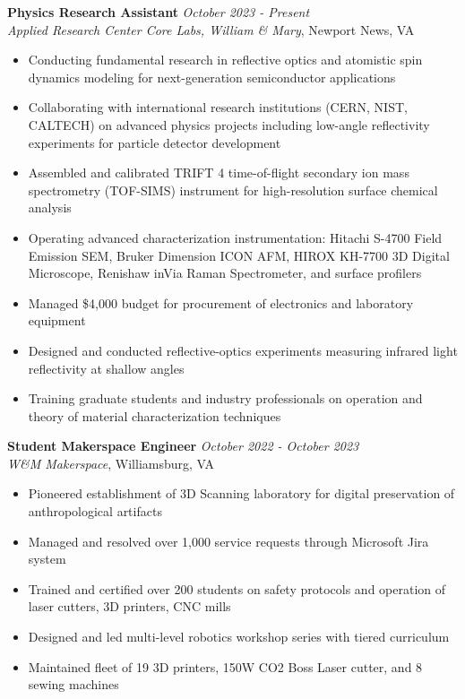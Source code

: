 \documentclass[11pt,letterpaper]{article}
\newcommand{\daterange}[1]{\textit{\color{secondary}#1}}
\newcommand{\position}[1]{\textbf{#1}}
\newcommand{\organization}[1]{\textit{#1}}
\begin{document}
\vspace{8pt}
\noindent
\position{Physics Research Assistant} \hfill \daterange{October 2023 - Present}\\
\organization{Applied Research Center Core Labs, William \& Mary}, Newport News, VA
\begin{itemize}
    \item Conducting fundamental research in reflective optics and atomistic spin dynamics modeling for next-generation semiconductor applications
    \item Collaborating with international research institutions (CERN, NIST, CALTECH) on advanced physics projects including low-angle reflectivity experiments for particle detector development
    \item Assembled and calibrated TRIFT 4 time-of-flight secondary ion mass spectrometry (TOF-SIMS) instrument for high-resolution surface chemical analysis
    \item Operating advanced characterization instrumentation: Hitachi S-4700 Field Emission SEM, Bruker Dimension ICON AFM, HIROX KH-7700 3D Digital Microscope, Renishaw inVia Raman Spectrometer, and surface profilers
    \item Managed \$4,000 budget for procurement of electronics and laboratory equipment
    \item Designed and conducted reflective-optics experiments measuring infrared light reflectivity at shallow angles
    \item Training graduate students and industry professionals on operation and theory of material characterization techniques
\end{itemize}

\vspace{8pt}
\noindent
\position{Student Makerspace Engineer} \hfill \daterange{October 2022 - October 2023}\\
\organization{W\&M Makerspace}, Williamsburg, VA
\begin{itemize}
    \item Pioneered establishment of 3D Scanning laboratory for digital preservation of anthropological artifacts
    \item Managed and resolved over 1,000 service requests through Microsoft Jira system
    \item Trained and certified over 200 students on safety protocols and operation of laser cutters, 3D printers, CNC mills
    \item Designed and led multi-level robotics workshop series with tiered curriculum
    \item Maintained fleet of 19 3D printers, 150W CO2 Boss Laser cutter, and 8 sewing machines
\end{itemize}
\end{document}
